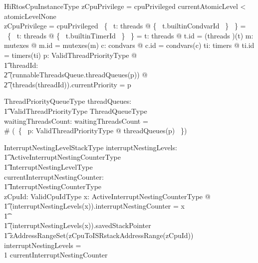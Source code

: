 \documentclass{AUJarticle}
\begin{document}
\begin{schema}{HiRtosCpuInstanceType}
    zCpuPrivilege = cpuPrivileged
\also
    currentAtomicLevel < atomicLevelNone \implies \\
    zCpuPrivilege = cpuPrivileged
\also
    \bigcap~\{~ t: \ran threads @ \{~ t.builtinCondvarId ~\} ~\} = \emptyset
\also
    \bigcap~\{~ t: \ran threads @ \{~ t.builtinTimerId ~\} ~\} = \emptyset
\also
    \forall t: \ran threads @ t.id = (threads \inv)(t)
\also
    \forall m: \ran mutexes @ m.id = mutexes\inv(m)
\also
    \forall c: \ran condvars @  c.id = condvars\inv(c)
\also
    \forall ti: \ran timers @ ti.id = timers\inv(ti)
\also
    \forall p: ValidThreadPriorityType @ \\
\t1    \forall threadId: \\
\t2     \ran (runnableThreadsQueue.threadQueues(p)) @ \\
\t2    (threads(threadId)).currentPriority = p
\end{schema}

\begin{schema}{ThreadPriorityQueueType}
    threadQueues: \\
    \t1 ValidThreadPriorityType \inj ThreadQueueType \\
    waitingThreadsCount: \nat
\where
   waitingThreadsCount = \\
   \# (\bigcup ~\{~ p: ValidThreadPriorityType @ threadQueues(p) ~\})
\end{schema}

\begin{schema}{InterruptNestingLevelStackType}
       interruptNestingLevels: \\
    \t1 ActiveInterruptNestingCounterType \inj \\
    \t1 InterruptNestingLevelType \\
    currentInterruptNestingCounter: \\
    \t1 InterruptNestingCounterType \\
    zCpuId: ValidCpuIdType
\where
   \forall x: ActiveInterruptNestingCounterType @ \\
\t1   (interruptNestingLevels(x)).interruptNestingCounter = x \\
\t1   \land \\
\t1   (interruptNestingLevels(x)).savedStackPointer \in \\
\t1        zAddressRangeSet(zCpuToISRstackAddressRange(zCpuId))
\also
   \dom interruptNestingLevels = \\
   1 \upto currentInterruptNestingCounter
\end{schema}
\end{document}
